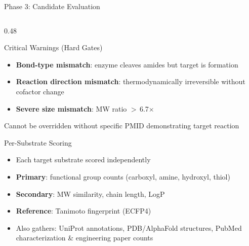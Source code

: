 \documentclass[aspectratio=169, 11pt]{beamer}
\begin{document}
\begin{frame}{Phase 3: Candidate Evaluation}
\begin{columns}[T]
\begin{column}{0.48\textwidth}
\begin{alertblock}{\small Critical Warnings (Hard Gates)}
\vspace{-2pt}
\begin{itemize}\scriptsize
\setlength\itemsep{1pt}
\item \textbf{Bond-type mismatch}: enzyme cleaves amides but target is formation
\item \textbf{Reaction direction mismatch}: thermodynamically irreversible without cofactor change
\item \textbf{Severe size mismatch}: MW ratio $>$\,6.7$\times$
\end{itemize}
{\tiny\color{accentred} Cannot be overridden without specific PMID demonstrating target reaction}
\end{alertblock}

\vspace{2pt}
\begin{exampleblock}{\small Per-Substrate Scoring}
\vspace{-2pt}
\begin{itemize}\scriptsize
\setlength\itemsep{1pt}
\item Each target substrate scored independently
\item \textbf{Primary}: functional group counts (carboxyl, amine, hydroxyl, thiol)
\item \textbf{Secondary}: MW similarity, chain length, LogP
\item \textbf{Reference}: Tanimoto fingerprint (ECFP4)
\item Also gathers: UniProt annotations, PDB/AlphaFold structures, PubMed characterization \& engineering paper counts
\end{itemize}
\end{exampleblock}

\end{column}
\end{columns}
\end{frame}
\end{document}
